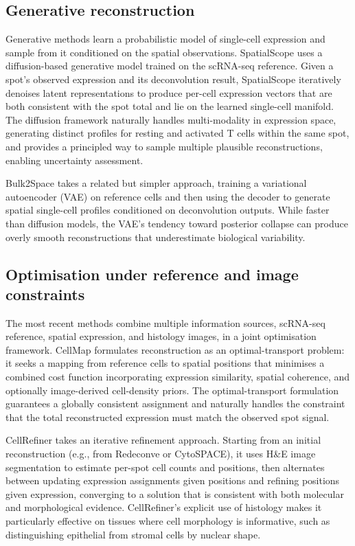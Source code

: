 \subsection{Generative reconstruction}

Generative methods learn a probabilistic model of single-cell expression and sample from it conditioned on the spatial observations. SpatialScope \citep{shengquan2023spatialscope} uses a diffusion-based generative model trained on the scRNA-seq reference. Given a spot's observed expression and its deconvolution result, SpatialScope iteratively denoises latent representations to produce per-cell expression vectors that are both consistent with the spot total and lie on the learned single-cell manifold. The diffusion framework naturally handles multi-modality in expression space, generating distinct profiles for resting and activated T cells within the same spot, and provides a principled way to sample multiple plausible reconstructions, enabling uncertainty assessment.

Bulk2Space takes a related but simpler approach, training a variational autoencoder (VAE) on reference cells and then using the decoder to generate spatial single-cell profiles conditioned on deconvolution outputs. While faster than diffusion models, the VAE's tendency toward posterior collapse can produce overly smooth reconstructions that underestimate biological variability.

\subsection{Optimisation under reference and image constraints}

The most recent methods combine multiple information sources, scRNA-seq reference, spatial expression, and histology images, in a joint optimisation framework. CellMap formulates reconstruction as an optimal-transport problem: it seeks a mapping from reference cells to spatial positions that minimises a combined cost function incorporating expression similarity, spatial coherence, and optionally image-derived cell-density priors. The optimal-transport formulation guarantees a globally consistent assignment and naturally handles the constraint that the total reconstructed expression must match the observed spot signal.

CellRefiner takes an iterative refinement approach. Starting from an initial reconstruction (e.g., from Redeconve or CytoSPACE), it uses H\&E image segmentation to estimate per-spot cell counts and positions, then alternates between updating expression assignments given positions and refining positions given expression, converging to a solution that is consistent with both molecular and morphological evidence. CellRefiner's explicit use of histology makes it particularly effective on tissues where cell morphology is informative, such as distinguishing epithelial from stromal cells by nuclear shape.

